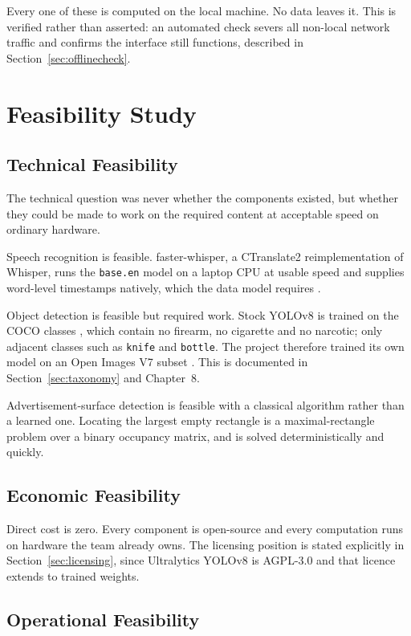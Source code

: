 \documentclass[
12pt,
a4paper,
oneside
]{report}
\begin{document}
Every one of these is computed on the local machine. No data leaves it. This is
verified rather than asserted: an automated check severs all non-local network
traffic and confirms the interface still functions, described in
Section~\ref{sec:offlinecheck}.

\section{Feasibility Study}

\subsection{Technical Feasibility}

The technical question was never whether the components existed, but whether
they could be made to work on the required content at acceptable speed on
ordinary hardware.

Speech recognition is feasible. faster-whisper, a CTranslate2 reimplementation
of Whisper, runs the \texttt{base.en} model on a laptop CPU at usable speed and
supplies word-level timestamps natively, which the data model requires
\cite{CTranslate2, Radford2023}.

Object detection is feasible but required work. Stock YOLOv8 is trained on the
COCO classes \cite{Lin2014, Jocher2023}, which contain no firearm, no cigarette
and no narcotic; only adjacent classes such as \texttt{knife} and
\texttt{bottle}. The project therefore trained its own model on an Open Images
V7 subset \cite{Kuznetsova2020}. This is documented in
Section~\ref{sec:taxonomy} and Chapter~8.

Advertisement-surface detection is feasible with a classical algorithm rather
than a learned one. Locating the largest empty rectangle is a maximal-rectangle
problem over a binary occupancy matrix, and is solved deterministically and
quickly.

\subsection{Economic Feasibility}

Direct cost is zero. Every component is open-source and every computation runs
on hardware the team already owns. The licensing position is stated explicitly
in Section~\ref{sec:licensing}, since Ultralytics YOLOv8 is AGPL-3.0 and that
licence extends to trained weights.

\subsection{Operational Feasibility}
\end{document}
